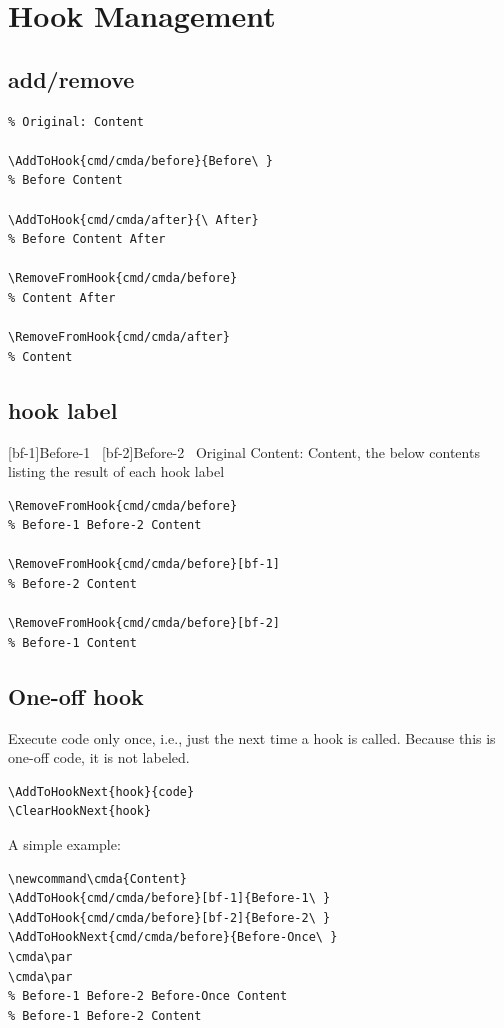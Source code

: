 \documentclass{article}
\newcommand\cmda{Content}
\begin{document}
\tableofcontents
\newpage

\section{Hook Management}
\subsection{add/remove}
\begin{lstlisting}
% Original: Content

\AddToHook{cmd/cmda/before}{Before\ }
% Before Content

\AddToHook{cmd/cmda/after}{\ After}
% Before Content After

\RemoveFromHook{cmd/cmda/before}
% Content After

\RemoveFromHook{cmd/cmda/after}
% Content
\end{lstlisting}


\subsection{hook label}
[bf-1]{Before-1\ }
[bf-2]{Before-2\ }
\quad Original Content: \cmda, the below contents listing the result of each hook label\par

\begin{lstlisting}
\RemoveFromHook{cmd/cmda/before}
% Before-1 Before-2 Content

\RemoveFromHook{cmd/cmda/before}[bf-1]
% Before-2 Content

\RemoveFromHook{cmd/cmda/before}[bf-2]
% Before-1 Content
\end{lstlisting}

\subsection{One-off hook}
Execute code only once, i.e., just the next time a hook is called. Because this is one-off code, it is
not labeled.
\begin{lstlisting}
\AddToHookNext{hook}{code}
\ClearHookNext{hook}
\end{lstlisting}

A simple example:
\begin{lstlisting}
\newcommand\cmda{Content}
\AddToHook{cmd/cmda/before}[bf-1]{Before-1\ }
\AddToHook{cmd/cmda/before}[bf-2]{Before-2\ }
\AddToHookNext{cmd/cmda/before}{Before-Once\ }
\cmda\par
\cmda\par
% Before-1 Before-2 Before-Once Content
% Before-1 Before-2 Content
\end{lstlisting}
\end{document}
